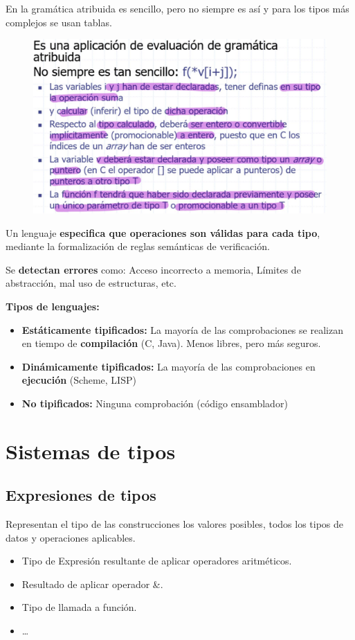 \documentclass[12pt, twoside, openright]{report} %
\begin{document}
En la gramática atribuida es sencillo, pero no siempre es así y para los tipos más complejos se usan tablas.
\begin{figure}[H]
  {\includegraphics[scale=.25]{2021-05-01 02_14_46-06_resum_Tipos_2021.pdf - Foxit Reader.jpg}}
\end{figure}

Un lenguaje \textbf{especifica que operaciones son válidas para cada tipo}, mediante la formalización de reglas semánticas de verificación.

Se \textbf{detectan errores} como: Acceso incorrecto a memoria, Límites de abstracción, mal uso de estructuras, etc.

\textbf{Tipos de lenguajes:}
\begin{itemize}
  \item \textbf{Estáticamente tipificados:} La mayoría de las comprobaciones se realizan en tiempo de \textbf{compilación} (C, Java). Menos libres, pero más seguros.
  \item \textbf{Dinámicamente tipificados:} La mayoría de las comprobaciones en \textbf{ejecución} (Scheme, LISP)
  \item \textbf{No tipificados:} Ninguna comprobación (código ensamblador)
\end{itemize}

\section{Sistemas de tipos}
\subsection{Expresiones de tipos}
Representan el tipo de las construcciones los valores posibles, todos los tipos de datos y operaciones aplicables.
\begin{itemize}
  \item Tipo de Expresión resultante de aplicar operadores aritméticos.
  \item Resultado de aplicar operador \&.
  \item Tipo de llamada a función.
  \item …
\end{itemize}
\end{document}
